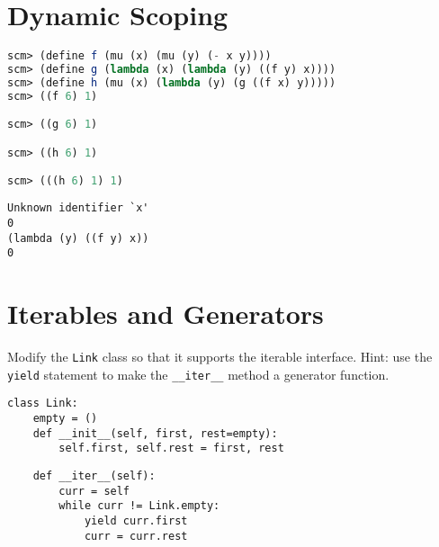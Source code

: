 \section{Dynamic Scoping}
\begin{lstlisting}[language=Scheme]
scm> (define f (mu (x) (mu (y) (- x y))))
scm> (define g (lambda (x) (lambda (y) ((f y) x))))
scm> (define h (mu (x) (lambda (y) (g ((f x) y)))))
scm> ((f 6) 1)

scm> ((g 6) 1)

scm> ((h 6) 1)

scm> (((h 6) 1) 1)

\end{lstlisting}

\begin{solution}[0in]
\begin{lstlisting}
Unknown identifier `x'
0
(lambda (y) ((f y) x))
0
\end{lstlisting}
\end{solution}

\section{Iterables and Generators}
\begin{questions}
\question
Modify the \texttt{Link} class so that it supports the iterable interface. Hint:
use the \texttt{yield} statement to make the \texttt{\_\_iter\_\_} method a
generator function.
\begin{lstlisting}
class Link:
    empty = ()
    def __init__(self, first, rest=empty):
        self.first, self.rest = first, rest
\end{lstlisting}
\begin{solution}[0.5in]
\begin{lstlisting}
    def __iter__(self):
        curr = self
        while curr != Link.empty:
            yield curr.first
            curr = curr.rest
\end{lstlisting}
\end{solution}
\end{questions}

